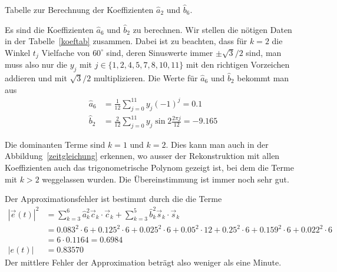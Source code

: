 \begin{loesung}
\begin{table}
\caption{Tabelle zur Berechnung der Koeffizienten $\hat a_2$ und $\hat b_6$.
\label{koeftab}}
\end{table}
\begin{teilaufgaben}
\item
Es sind die Koeffizienten $\hat a_6$ und $\hat b_2$ zu berechnen.
Wir stellen die nötigen Daten in der Tabelle~\ref{koeftab} zusammen.
Dabei ist zu beachten, dass für $k=2$ die Winkel $t_j$ Vielfache von $60^\circ$
sind, deren Sinuswerte immer $\pm\!\sqrt{3}/2$ sind, man muss also nur 
die $y_j$ mit $j\in\{1,2,4,5,7,8,10,11\}$ mit den richtigen Vorzeichen
addieren und mit $\!\sqrt{3}/2$ multiplizieren.
Die Werte für $\hat a_6$ und $\hat b_2$ bekommt man aus
\begin{align*}
\hat a_6
&=
\frac{1}{12}
\sum_{j=0}^{11}
y_j (-1)^j
=
0.1
\\
\hat b_2
&=
\frac{2}{12}
\sum_{j=0}^{11}
y_j \sin 2\frac{2\pi j}{12}
=
-9.165
\end{align*}
\item
Die dominanten Terme sind $k=1$ und $k=2$.
Dies kann man auch in der Abbildung~\ref{zeitgleichung} erkennen, wo
ausser der Rekonstruktion mit allen Koeffizienten auch das
trigonometrische Polynom gezeigt ist, bei dem die Terme mit $k>2$ weggelassen
wurden.
Die Übereinstimmung ist immer noch sehr gut.
\item
Der Approximationsfehler ist bestimmt durch die die Terme 
\begin{align*}
|\vec{e}(t)|^2
&=
\sum_{k=3}^6 \hat a_k^2 \vec{c}_k\cdot\vec{c}_k
+
\sum_{k=3}^5 \hat b_k^2 \vec{s}_k\cdot\vec{s}_k
\\
&=
0.083^2\cdot 6
+0.125^2\cdot 6
+0.025^2\cdot 6
+0.05^2\cdot 12
+0.25^2\cdot 6
+0.159^2\cdot 6
+0.022^2\cdot 6
\\
&=
6\cdot 0.1164
=
0.6984
\\
|e(t)|
&=
0.83570
\end{align*}
Der mittlere Fehler der Approximation beträgt also weniger als eine Minute.
\qedhere
\end{teilaufgaben}
\end{loesung}

